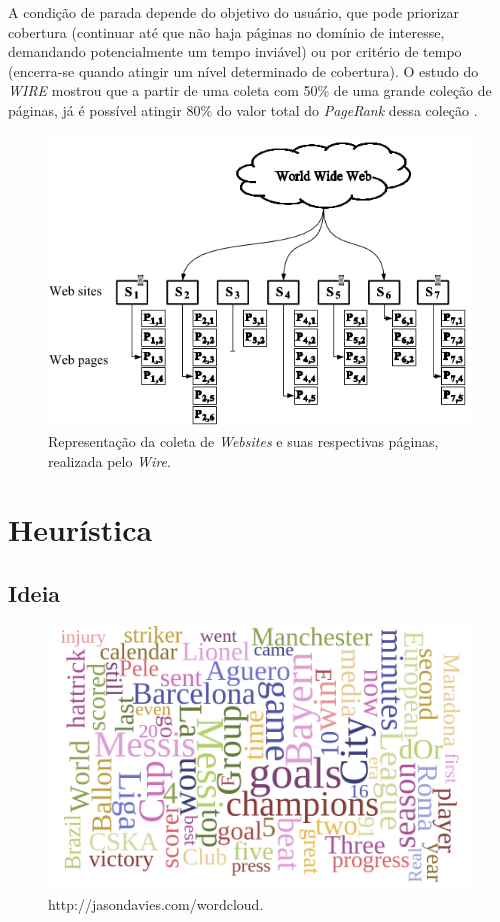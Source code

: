 \documentclass[a4paper,12pt,titlepage]{article}
\begin{document}
A condição de parada depende do objetivo do usuário, que pode priorizar cobertura (continuar até que não haja páginas no domínio de interesse, demandando potencialmente um tempo inviável) ou por critério de tempo (encerra-se quando atingir um nível determinado de cobertura). O estudo do \textit{WIRE} mostrou que a partir de uma coleta com 50\% de uma grande coleção de páginas, já é possível atingir 80\% do valor total do \textit{PageRank} dessa coleção \cite{carlos}.

\begin{figure}[H]
     \centering
     \includegraphics[scale=0.5]{figures/harvester.png}
     \caption{Representação da coleta de \textit{Websites} e suas respectivas páginas, realizada pelo \textit{Wire}.}
     \label{bsp}
\end{figure}


\section{Heurística}

\subsection{Ideia}

\begin{figure}[H]
     \centering
     \includegraphics[scale=0.35]{figures/football-cloud.png}
     \caption{http://jasondavies.com/wordcloud.}
     \label{bsp}
\end{figure}
\end{document}
